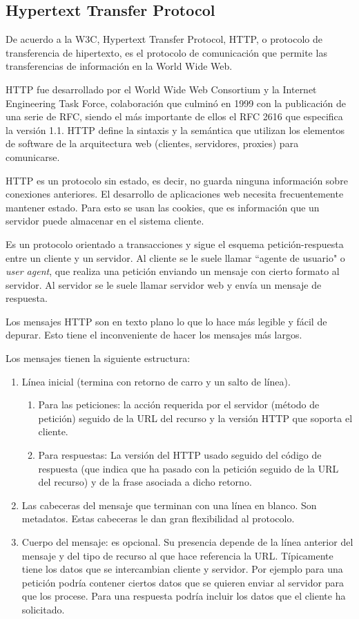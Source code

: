 \subsection*{Hypertext Transfer Protocol}
De acuerdo a la W3C\cite{noauthor_http_nodate}, Hypertext Transfer Protocol, HTTP, o protocolo de transferencia de hipertexto, es el protocolo de comunicación que permite las transferencias de información en la World Wide Web.


HTTP fue desarrollado por el World Wide Web Consortium y la Internet Engineering Task Force, colaboración que culminó en 1999 con la publicación de una serie de RFC, siendo el más importante de ellos el RFC 2616 que especifica la versión 1.1. HTTP define la sintaxis y la semántica que utilizan los elementos de software de la arquitectura web (clientes, servidores, proxies) para comunicarse.


HTTP es un protocolo sin estado, es decir, no guarda ninguna información sobre conexiones anteriores. El desarrollo de aplicaciones web necesita frecuentemente mantener estado. Para esto se usan las cookies, que es información que un servidor puede almacenar en el sistema cliente.


Es un protocolo orientado a transacciones y sigue el esquema petición-respuesta entre un cliente y un servidor. Al cliente se le suele llamar ``agente de usuario" o \textit{user agent}, que realiza una petición enviando un mensaje con cierto formato al servidor. Al servidor se le suele llamar servidor web y envía un mensaje de respuesta. 


Los mensajes HTTP son en texto plano lo que lo hace más legible y fácil de depurar. Esto tiene el inconveniente de hacer los mensajes más largos.

Los mensajes tienen la siguiente estructura:

\begin{enumerate}
    \item Línea inicial (termina con retorno de carro y un salto de línea).
    \begin{enumerate}
        \item Para las peticiones: la acción requerida por el servidor (método de petición) seguido de la URL del recurso y la versión HTTP que soporta el cliente.
        \item Para respuestas: La versión del HTTP usado seguido del código de respuesta (que indica que ha pasado con la petición seguido de la URL del recurso) y de la frase asociada a dicho retorno.        
    \end{enumerate}
    \item Las cabeceras del mensaje que terminan con una línea en blanco. Son metadatos. Estas cabeceras le dan gran flexibilidad al protocolo.
    \item Cuerpo del mensaje: es opcional. Su presencia depende de la línea anterior del mensaje y del tipo de recurso al que hace referencia la URL. Típicamente tiene los datos que se intercambian cliente y servidor. Por ejemplo para una petición podría contener ciertos datos que se quieren enviar al servidor para que los procese. Para una respuesta podría incluir los datos que el cliente ha solicitado.
\end{enumerate}


